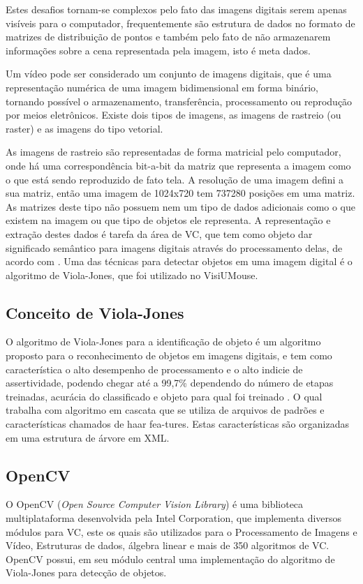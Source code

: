 Estes desafios tornam-se complexos pelo fato das imagens digitais serem apenas visíveis para o computador, frequentemente são estrutura de dados no formato de matrizes de distribuição de pontos e também pelo fato de não armazenarem informações sobre a cena representada pela imagem, isto é meta dados. 

Um vídeo pode ser considerado um conjunto de imagens digitais, que é uma representação numérica de uma imagem bidimensional em forma binário, tornando possível o armazenamento, transferência, processamento ou reprodução por meios eletrônicos. Existe dois tipos de imagens, as imagens de rastreio (ou raster) e as imagens do tipo vetorial.

As imagens de rastreio são representadas de forma matricial pelo computador, onde há uma correspondência bit-a-bit da matriz que representa a imagem como o que está sendo reproduzido de fato tela. A resolução de uma imagem defini a sua matriz, então uma imagem de 1024x720 tem 737280 posições em uma matriz. As matrizes deste tipo não possuem nem um tipo de dados adicionais como o que existem na imagem ou que tipo de objetos ele representa. A representação e extração destes dados é tarefa da área de VC, que tem como objeto dar significado semântico para imagens digitais através do processamento delas, de acordo com . Uma das técnicas para detectar objetos em uma imagem digital é o algoritmo de Viola-Jones, que foi utilizado no VisiUMouse.

\subsection{Conceito de Viola-Jones}
O algoritmo de Viola-Jones para a identificação de objeto é um algoritmo proposto para o reconhecimento de objetos em imagens digitais, e tem como característica o alto desempenho de processamento e o alto indicie de assertividade, podendo chegar até a 99,7\% dependendo do número de etapas treinadas, acurácia do classificado e objeto para qual foi treinado . O qual trabalha com algoritmo em cascata que se utiliza de arquivos de padrões e características chamados de haar fea-tures. Estas características são organizadas em uma estrutura de árvore em XML.

\subsection{OpenCV}
O OpenCV (\textit{Open Source Computer Vision Library}) é uma biblioteca multiplataforma desenvolvida pela Intel Corporation, que implementa diversos módulos para VC, este os quais são utilizados para o Processamento de Imagens e Vídeo, Estruturas de dados, álgebra linear e mais de 350 algoritmos de VC. OpenCV possui, em seu módulo central uma implementação do algoritmo de Viola-Jones para detecção de objetos. 

